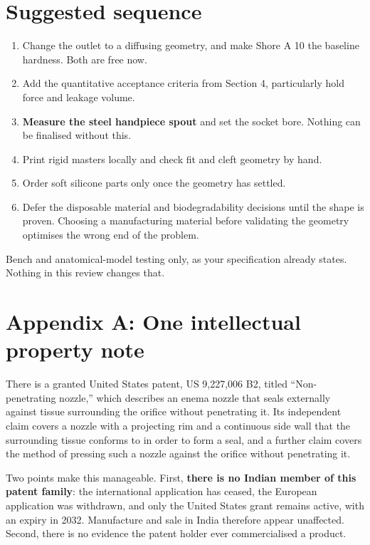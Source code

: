 \documentclass[11pt]{article}
\begin{document}
\section{Suggested sequence}

\begin{enumerate}
  \item Change the outlet to a diffusing geometry, and make Shore A 10 the baseline hardness. Both are free now.
  \item Add the quantitative acceptance criteria from Section 4, particularly hold force and leakage volume.
  \item \textbf{Measure the steel handpiece spout} and set the socket bore. Nothing can be finalised without this.
  \item Print rigid masters locally and check fit and cleft geometry by hand.
  \item Order soft silicone parts only once the geometry has settled.
  \item Defer the disposable material and biodegradability decisions until the shape is proven. Choosing a manufacturing material before validating the geometry optimises the wrong end of the problem.
\end{enumerate}

\vspace{0.5em}
\noindent Bench and anatomical-model testing only, as your specification already states. Nothing in this review changes that.

\section*{\sffamily\color{accent} Appendix A: One intellectual property note}

There is a granted United States patent, US 9,227,006 B2, titled ``Non-penetrating nozzle,'' which describes an enema nozzle that seals externally against tissue surrounding the orifice without penetrating it. Its independent claim covers a nozzle with a projecting rim and a continuous side wall that the surrounding tissue conforms to in order to form a seal, and a further claim covers the method of pressing such a nozzle against the orifice without penetrating it.

Two points make this manageable. First, \textbf{there is no Indian member of this patent family}: the international application has ceased, the European application was withdrawn, and only the United States grant remains active, with an expiry in 2032. Manufacture and sale in India therefore appear unaffected. Second, there is no evidence the patent holder ever commercialised a product.
\end{document}
